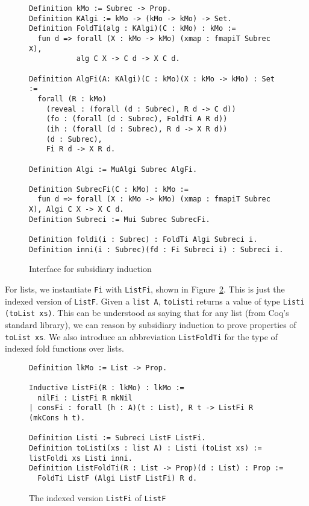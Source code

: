 \documentclass[a4paper,USenglish]{lipics-v2021}
\begin{document}
\begin{figure}
\begin{verbatim}
Definition kMo := Subrec -> Prop.
Definition KAlgi := kMo -> (kMo -> kMo) -> Set.
Definition FoldTi(alg : KAlgi)(C : kMo) : kMo :=
  fun d => forall (X : kMo -> kMo) (xmap : fmapiT Subrec X), 
           alg C X -> C d -> X C d.

Definition AlgFi(A: KAlgi)(C : kMo)(X : kMo -> kMo) : Set :=
  forall (R : kMo)
    (reveal : (forall (d : Subrec), R d -> C d))        
    (fo : (forall (d : Subrec), FoldTi A R d))
    (ih : (forall (d : Subrec), R d -> X R d))
    (d : Subrec),
    Fi R d -> X R d.

Definition Algi := MuAlgi Subrec AlgFi.

Definition SubrecFi(C : kMo) : kMo := 
  fun d => forall (X : kMo -> kMo) (xmap : fmapiT Subrec X), Algi C X -> X C d.
Definition Subreci := Mui Subrec SubrecFi.

Definition foldi(i : Subrec) : FoldTi Algi Subreci i.
Definition inni(i : Subrec)(fd : Fi Subreci i) : Subreci i.
\end{verbatim}
\caption{Interface for subsidiary induction}
\label{fig:subreci}
\end{figure}

For lists, we instantiate \verb|Fi| with \verb|ListFi|, shown in
Figure~\ref{fig:listfi}.  This is just the indexed version of
\verb|ListF|.  Given a \verb|list A|, \verb|toListi| returns
a value of type \verb|Listi (toList xs)|.  This can be understood
as saying that for any list (from Coq's standard library),
we can reason by subsidiary induction to prove properties of \verb|toList xs|.
We also introduce an abbreviation \verb|ListFoldTi| for the type
of indexed fold functions over lists.

\begin{figure}
\begin{verbatim}
Definition lkMo := List -> Prop.

Inductive ListFi(R : lkMo) : lkMo :=
  nilFi : ListFi R mkNil
| consFi : forall (h : A)(t : List), R t -> ListFi R (mkCons h t).

Definition Listi := Subreci ListF ListFi.
Definition toListi(xs : list A) : Listi (toList xs) := listFoldi xs Listi inni.
Definition ListFoldTi(R : List -> Prop)(d : List) : Prop :=
  FoldTi ListF (Algi ListF ListFi) R d.
\end{verbatim}
\caption{The indexed version \texttt{ListFi} of \texttt{ListF}}
\label{fig:listfi}
\end{figure}
\end{document}
